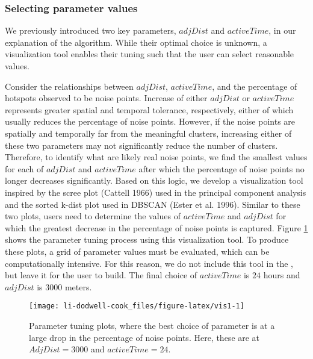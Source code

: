 \hypertarget{selecting-parameter-values}{%
\subsubsection{Selecting parameter values}\label{selecting-parameter-values}}

We previously introduced two key parameters, \(adjDist\) and \(activeTime\), in our explanation of the algorithm. While their optimal choice is unknown, a visualization tool enables their tuning such that the user can select reasonable values.

Consider the relationships between \(adjDist\), \(activeTime\), and the percentage of hotspots observed to be noise points. Increase of either \(adjDist\) or \(activeTime\) represents greater spatial and temporal tolerance, respectively, either of which usually reduces the percentage of noise points. However, if the noise points are spatially and temporally far from the meaningful clusters, increasing either of these two parameters may not significantly reduce the number of clusters. Therefore, to identify what are likely real noise points, we find the smallest values for each of \(adjDist\) and \(activeTime\) after which the percentage of noise points no longer decreases significantly. Based on this logic, we develop a visualization tool inspired by the scree plot (Cattell 1966) used in the principal component analysis and the sorted k-dist plot used in DBSCAN (Ester et al. 1996). Similar to these two plots, users need to determine the values of \(activeTime\) and \(adjDist\) for which the greatest decrease in the percentage of noise points is captured. Figure \ref{fig:vis1} shows the parameter tuning process using this visualization tool. To produce these plots, a grid of parameter values must be evaluated, which can be computationally intensive. For this reason, we do not include this tool in the , but leave it for the user to build. The final choice of \(activeTime\) is \(24\) hours and \(adjDist\) is \(3000\) meters.

\begin{figure}

{\centering \texttt{[image: li-dodwell-cook\_files/figure-latex/vis1-1]} 

}

\caption{Parameter tuning plots, where the best choice of parameter is at a large drop in the percentage of noise points. Here, these are at $AdjDist = 3000$ and $activeTime = 24$. }\label{fig:vis1}
\end{figure}

